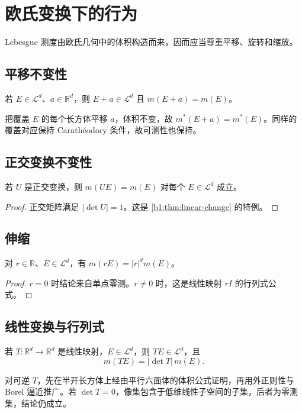 \section{欧氏变换下的行为}
\label{b1:sec:0304}

Lebesgue 测度由欧氏几何中的体积构造而来，因而应当尊重平移、旋转和缩放。

\subsection{平移不变性}
\label{b1:subsec:030401}

\begin{theorem}\label{b1:thm:translation-invariance}
若 \(E\in\mathcal L^d\)、\(a\in\mathbb R^d\)，则 \(E+a\in\mathcal L^d\) 且 \(m(E+a)=m(E)\)。
\end{theorem}
\begin{proofsketch}
把覆盖 \(E\) 的每个长方体平移 \(a\)，体积不变，故 \(m^*(E+a)=m^*(E)\)。同样的覆盖对应保持 Carathéodory 条件，故可测性也保持。
\end{proofsketch}

\subsection{正交变换不变性}
\label{b1:subsec:030402}

\begin{theorem}\label{b1:thm:orthogonal-invariance}
若 \(U\) 是正交变换，则 \(m(UE)=m(E)\) 对每个 \(E\in\mathcal L^d\) 成立。
\end{theorem}
\begin{proof}
正交矩阵满足 \(\lvert\det U\rvert=1\)。这是 \cref{b1:thm:linear-change} 的特例。
\end{proof}

\subsection{伸缩}
\label{b1:subsec:030403}

\begin{proposition}\label{b1:prop:scaling}
对 \(r\in\mathbb R\)、\(E\in\mathcal L^d\)，有 \(m(rE)=\lvert r\rvert^d m(E)\)。
\end{proposition}
\begin{proof}
\(r=0\) 时结论来自单点零测。\(r\ne0\) 时，这是线性映射 \(rI\) 的行列式公式。
\end{proof}

\subsection{线性变换与行列式}
\label{b1:subsec:030404}

\begin{theorem}\label{b1:thm:linear-change}
若 \(T:\mathbb R^d\to\mathbb R^d\) 是线性映射，\(E\in\mathcal L^d\)，则 \(TE\in\mathcal L^d\)，且
\[
m(TE)=\lvert\det T\rvert\,m(E).
\]
\end{theorem}
\begin{proofsketch}
对可逆 \(T\)，先在半开长方体上经由平行六面体的体积公式证明，再用外正则性与 Borel 逼近推广。若 \(\det T=0\)，像集包含于低维线性子空间的子集，后者为零测集，结论仍成立。
\end{proofsketch}
